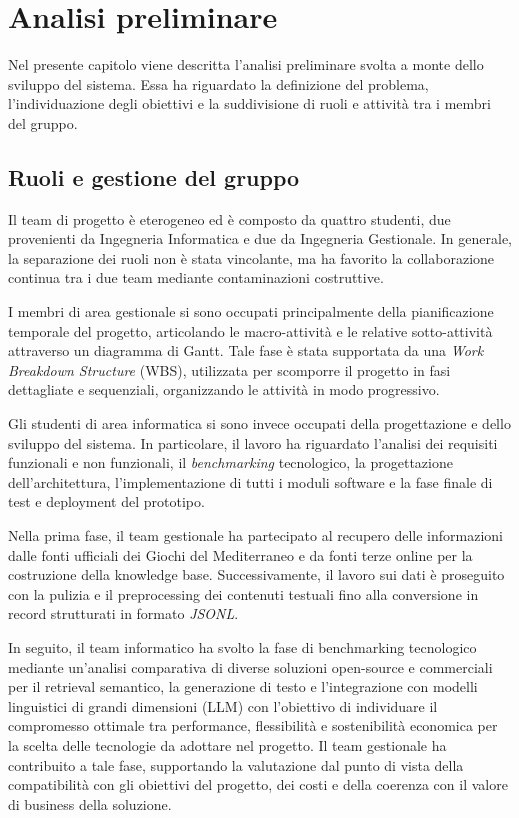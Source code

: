 \chapter{Analisi preliminare}

Nel presente capitolo viene descritta l’analisi preliminare svolta a monte dello sviluppo del sistema. Essa ha riguardato la definizione del problema, l’individuazione degli obiettivi e la suddivisione di ruoli e attività tra i membri del gruppo.

\section{Ruoli e gestione del gruppo}

Il team di progetto è eterogeneo ed è composto da quattro studenti, due provenienti da Ingegneria Informatica e due da Ingegneria Gestionale. In generale, la separazione dei ruoli non è stata vincolante, ma ha favorito la collaborazione continua tra i due team mediante contaminazioni costruttive.

I membri di area gestionale si sono occupati principalmente della pianificazione temporale del progetto, articolando le macro-attività e le relative sotto-attività attraverso un diagramma di Gantt. Tale fase è stata supportata da una \textit{Work Breakdown Structure} (WBS), utilizzata per scomporre il progetto in fasi dettagliate e sequenziali, organizzando le attività in modo progressivo.

Gli studenti di area informatica si sono invece occupati della progettazione e dello sviluppo del sistema. In particolare, il lavoro ha riguardato l’analisi dei requisiti funzionali e non funzionali, il \textit{benchmarking} tecnologico, la progettazione dell’architettura, l’implementazione di tutti i moduli software e la fase finale di test e deployment del prototipo.

Nella prima fase, il team gestionale ha partecipato al recupero delle informazioni dalle fonti ufficiali dei Giochi del Mediterraneo e da fonti terze online per la costruzione della knowledge base. Successivamente, il lavoro sui dati è proseguito con la pulizia e il preprocessing dei contenuti testuali fino alla conversione in record strutturati in formato \textit{JSONL}.

In seguito, il team informatico ha svolto la fase di benchmarking tecnologico mediante un'analisi comparativa di diverse soluzioni open-source e commerciali per il retrieval semantico, la generazione di testo e l'integrazione con modelli linguistici di grandi dimensioni (LLM) con l'obiettivo di individuare il compromesso ottimale tra performance, flessibilità e sostenibilità economica per la scelta delle tecnologie da adottare nel progetto. Il team gestionale ha contribuito a tale fase, supportando la valutazione dal punto di vista della compatibilità con gli obiettivi del progetto, dei costi e della coerenza con il valore di business della soluzione.

